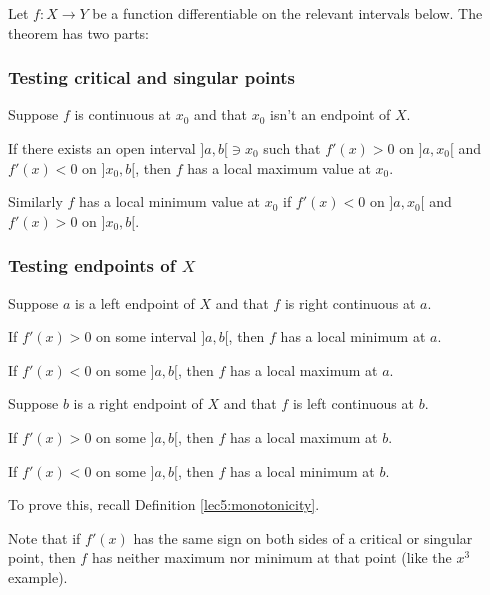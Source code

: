 \begin{theorem}
	Let $f \colon X \to Y$ be a function differentiable on the relevant intervals below. The theorem has two parts:

	\subsubsection*{Testing critical and singular points}

	Suppose $f$ is continuous at $x_0$ and that $x_0$ isn't an endpoint of $X$.
	\begin{romanlist}
		\item If there exists an open interval ${]{a, b}[} \ni x_0$ such that $f'(x) > 0$ on ${]{a, x_0}[}$ and $f'(x) < 0$ on ${]{x_0, b}[}$, then $f$ has a local maximum value at $x_0$.
		\item Similarly $f$ has a local minimum value at $x_0$ if $f'(x) < 0$ on ${]{a, x_0}[}$ and $f'(x) > 0$ on ${]{x_0, b}[}$.
	\end{romanlist}

	\subsubsection*{Testing endpoints of $X$}

	Suppose $a$ is a left endpoint of $X$ and that $f$ is right continuous at $a$.
	\begin{romanlist}
		\setcounter{enumi}{2}
		\item If $f'(x) > 0$ on some interval ${]{a, b}[}$, then $f$ has a local minimum at $a$.
		\item If $f'(x) < 0$ on some ${]{a, b}[}$, then $f$ has a local maximum at $a$.
	\end{romanlist}
	Suppose $b$ is a right endpoint of $X$ and that $f$ is left continuous at $b$.
	\begin{romanlist}
		\setcounter{enumi}{4}
		\item If $f'(x) > 0$ on some ${]{a, b}[}$, then $f$ has a local maximum at $b$.
		\item If $f'(x) < 0$ on some ${]{a, b}[}$, then $f$ has a local minimum at $b$.
	\end{romanlist}
\end{theorem}

\begin{exercise}
	To prove this, recall Definition \ref{lec5:monotonicity}.
\end{exercise}

\noindent
Note that if $f'(x)$ has the same sign on both sides of a critical or singular point, then $f$ has neither maximum nor minimum at that point (like the $x^3$ example).

